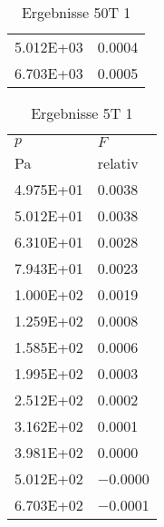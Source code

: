\begin{table}
\begin{tabular}{l l }
\num{5.012E+03}&\num{0.0004}\\
\num{6.703E+03}&\num{0.0005}\\
\bottomrule
\end{tabular}\caption{Ergebnisse 50T 1}\end{table}\begin{table}\begin{tabular}{l l }
\toprule
$p$&$F$\\
 Pa & relativ \\\midrule
\num{4.975E+01}&\num{0.0038}\\
\num{5.012E+01}&\num{0.0038}\\
\num{6.310E+01}&\num{0.0028}\\
\num{7.943E+01}&\num{0.0023}\\
\num{1.000E+02}&\num{0.0019}\\
\num{1.259E+02}&\num{0.0008}\\
\num{1.585E+02}&\num{0.0006}\\
\num{1.995E+02}&\num{0.0003}\\
\num{2.512E+02}&\num{0.0002}\\
\num{3.162E+02}&\num{0.0001}\\
\num{3.981E+02}&\num{0.0000}\\
\num{5.012E+02}&\num{-0.0000}\\
\num{6.703E+02}&\num{-0.0001}\\
\bottomrule
\end{tabular}\caption{Ergebnisse 5T 1}\end{table}